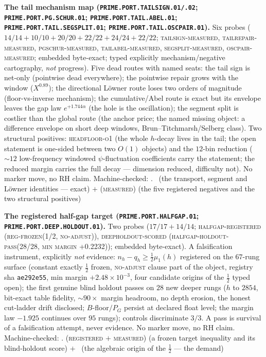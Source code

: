 \documentclass[11pt,a4paper]{article}
\theoremstyle{definition}
\begin{document}
\par\smallskip\noindent\textbf{The tail mechanism map
(\texttt{PRIME.PORT.TAILSIGN.01/\allowbreak .02};
\texttt{PRIME.PORT.PG.\allowbreak SCHUR.01};
\texttt{PRIME.PORT.TAIL.\allowbreak ABEL.01};
\texttt{PRIME.PORT.TAIL.\allowbreak SEGSPLIT.01};
\texttt{PRIME.PORT.TAIL.\allowbreak OSCPAIR.01}).}
Six probes ($14/14 + 10/10 + 20/20 + 22/22 + 24/24 + 22/22$;
\textsc{tailsign-measured}, \textsc{tailrepair-measured},
\textsc{pgschur-measured}, \textsc{tailabel-measured},
\textsc{segsplit-measured}, \textsc{oscpair-measured}; embedded
byte-exact; typed explicitly mechanism/negative cartography,
\emph{not} progress).  Five dead routes with named seats: the
tail sign is net-only (pointwise dead everywhere); the
pointwise repair grows with the window ($X^{0.89}$); the
directional L\"owner route loses two orders of magnitude
(floor-vs-inverse mechanism); the cumulative/Abel route is
exact but its envelope leaves the gap law $e^{+1.744\alpha}$
(the hole is the oscillation); the segment split is costlier
than the global route (the anchor price; the named missing
object: a difference envelope on short deep windows,
Brun--Titchmarsh/Selberg class).  Two structural positives:
\textsc{headfloor-o1} (the whole $h$-decay lives in the tail;
the open statement is one-sided between two $O(1)$ objects) and
the $12$-bin reduction (${\sim}12$ low-frequency windowed
$\psi$-fluctuation coefficients carry the statement; the
reduced margin carries the full decay --- dimension reduced,
difficulty not).  No marker move, no RH claim.
Machine-checked: .
\mE\ (the transport, segment and L\"owner identities --- exact)
$+$ (\textsc{measured}) (the five registered negatives and the
two structural positives)
\par\smallskip

\par\smallskip\noindent\textbf{The registered half-gap target
(\texttt{PRIME.PORT.\allowbreak HALFGAP.01};
\texttt{PRIME.PORT.DEEP.\allowbreak HOLDOUT.01}).}
Two probes ($17/17 + 14/14$; \textsc{halfgap-registered
(reg-frozen(1/2, no-adjust))}, \textsc{deepholdout-scored
(halfgap-holdout-pass(28/28, min margin +0.2232))}; embedded
byte-exact).  A falsification instrument, explicitly \emph{not}
evidence: $n_h - q_h \ge \tfrac12 \mu_1(h)$ registered on the
$67$-rung surface (constant exactly $\tfrac12$ frozen,
\textsc{no-adjust} clause part of the object, registry sha
\texttt{ae292e55}, min margin $+2.48\times10^{-3}$, four
candidate origins of the $\tfrac12$ typed open); the first
genuine blind holdout passes on $28$ new deeper rungs
($h$ to $2854$, bit-exact table fidelity, ${\sim}90\times$
margin headroom, no depth erosion, the honest cut-ladder drift
disclosed; $B$-floor$/P_G$ persist at declared float level; the
margin law $-1.925$ continues over $95$ rungs); controls
discriminate $3/3$.  A pass is survival of a falsification
attempt, never evidence.  No marker move, no RH claim.
Machine-checked: .
(\textsc{registered $+$ measured}) (a frozen target inequality
and its blind-holdout score) $+$ \mO\ (the algebraic origin of
the $\tfrac12$ --- the demand)
\par\smallskip
\end{document}
